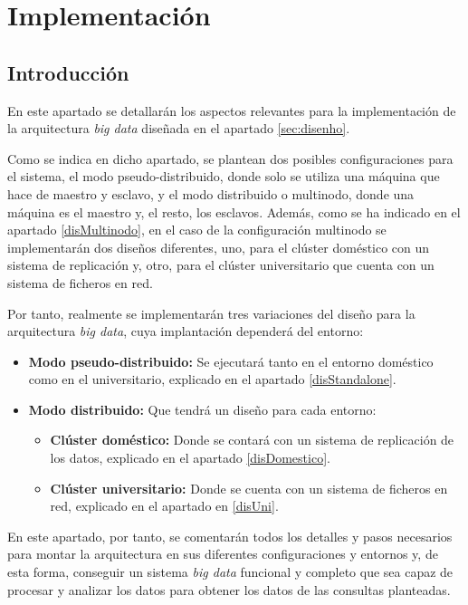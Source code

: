 \chapter{Implementación\label{sec:implementación}}

\section{Introducción}
En este apartado se detallarán los aspectos relevantes para la implementación de la arquitectura \textit{big data} diseñada en el apartado \ref{sec:disenho}.

Como se indica en dicho apartado, se plantean dos posibles configuraciones para el sistema, el modo pseudo-distribuido, donde solo se utiliza una máquina que hace de maestro y esclavo, y el modo distribuido o multinodo, donde una máquina es el maestro y, el resto, los esclavos. Además, como se ha indicado en el apartado \ref{disMultinodo}, en el caso de la configuración multinodo se implementarán dos diseños diferentes, uno, para el clúster doméstico con un sistema de replicación y, otro, para el clúster universitario que cuenta con un sistema de ficheros en red.

Por tanto, realmente se implementarán tres variaciones del diseño para la arquitectura \textit{big data}, cuya implantación dependerá del entorno:

\begin{itemize}
\item \textbf{Modo pseudo-distribuido:} Se ejecutará tanto en el entorno doméstico como en el universitario, explicado en el apartado \ref{disStandalone}.

\item \textbf{Modo distribuido:} Que tendrá un diseño para cada entorno:

\begin{itemize}
\item \textbf{Clúster doméstico:} Donde se contará con un sistema de replicación de los datos, explicado en el apartado \ref{disDomestico}.
\item \textbf{Clúster universitario:} Donde se cuenta con un sistema de ficheros en red, explicado en el apartado en \ref{disUni}.
\end{itemize}
\end{itemize}

En este apartado, por tanto, se comentarán todos los detalles y pasos necesarios para montar la arquitectura en sus diferentes configuraciones y entornos y, de esta forma, conseguir un sistema \textit{big data} funcional y completo que sea capaz de procesar y analizar los datos para obtener los datos de las consultas planteadas.

